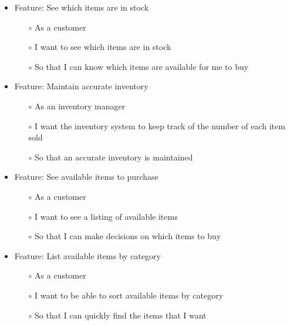\documentclass{scrreprt}
\begin{document}

\begin{itemize}
	\item Feature: See which items are in stock
	\begin{itemize}
		\item[$\circ$]As a customer
		\item[$\circ$]I want to see which items are in stock
		\item[$\circ$]So that I can know which items are available for me to buy
	\end{itemize}
\end{itemize}

\begin{itemize}
	\item Feature: Maintain accurate inventory
	\begin{itemize}
		\item[$\circ$]As an inventory manager
		\item[$\circ$]I want the inventory system to keep track of the number of each item sold
		\item[$\circ$]So that an accurate inventory is maintained
	\end{itemize}
\end{itemize}

\begin{itemize}
	\item Feature: See available items to purchase
	\begin{itemize}
		\item[$\circ$]As a customer
		\item[$\circ$]I want to see a listing of available items
		\item[$\circ$]So that I can make decisions on which items to buy
	\end{itemize}
\end{itemize}

\begin{itemize}
	\item Feature: List available items by category
	\begin{itemize}
		\item[$\circ$]As a customer
		\item[$\circ$]I want to be able to sort available items by category
		\item[$\circ$]So that I can quickly find the items that I want
	\end{itemize}
\end{itemize}
\end{document}
